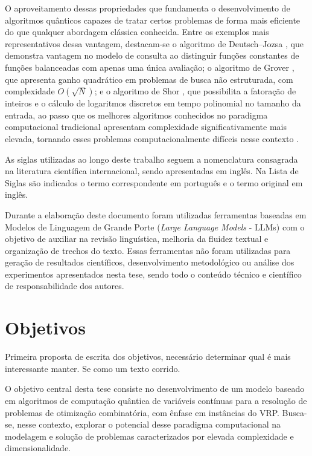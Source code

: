 O aproveitamento dessas propriedades que fundamenta o desenvolvimento de algoritmos quânticos capazes de tratar certos problemas de forma mais eficiente do que qualquer abordagem clássica conhecida. Entre os exemplos mais representativos dessa vantagem, destacam-se o algoritmo de Deutsch–Jozsa \cite{deutsch1991rapid}, que demonstra vantagem no modelo de consulta ao distinguir funções constantes de funções balanceadas com apenas uma única avaliação; o algoritmo de Grover \cite{grover1996fast}, que apresenta ganho quadrático em problemas de busca não estruturada, com complexidade $O(\sqrt{N})$; e o algoritmo de Shor \cite{shor1999polynomial}, que possibilita a fatoração de inteiros e o cálculo de logaritmos discretos em tempo polinomial no tamanho da entrada, ao passo que os melhores algoritmos conhecidos no paradigma computacional tradicional apresentam complexidade significativamente mais elevada, tornando esses problemas computacionalmente difíceis nesse contexto \cite{lenstra1993development}.

As siglas utilizadas ao longo deste trabalho seguem a nomenclatura consagrada na literatura científica internacional, sendo apresentadas em inglês. Na Lista de Siglas são indicados o termo correspondente em português e o termo original em inglês.

Durante a elaboração deste documento foram utilizadas ferramentas baseadas em Modelos de Linguagem de Grande Porte (\textit{Large Language Models} - LLMs) com o objetivo de auxiliar na revisão linguística, melhoria da fluidez textual e organização de trechos do texto. Essas ferramentas não foram utilizadas para geração de resultados científicos, desenvolvimento metodológico ou análise dos experimentos apresentados nesta tese, sendo todo o conteúdo técnico e científico de responsabilidade dos autores.

\section*{Objetivos}

{\color{red}Primeira proposta de escrita dos objetivos, necessário determinar qual é mais interessante manter. Se como um texto corrido.}

O objetivo central desta tese consiste no desenvolvimento de um modelo baseado em algoritmos de computação quântica de variáveis contínuas para a resolução de problemas de otimização combinatória, com ênfase em instâncias do VRP. Busca-se, nesse contexto, explorar o potencial desse paradigma computacional na modelagem e solução de problemas caracterizados por elevada complexidade e dimensionalidade.

